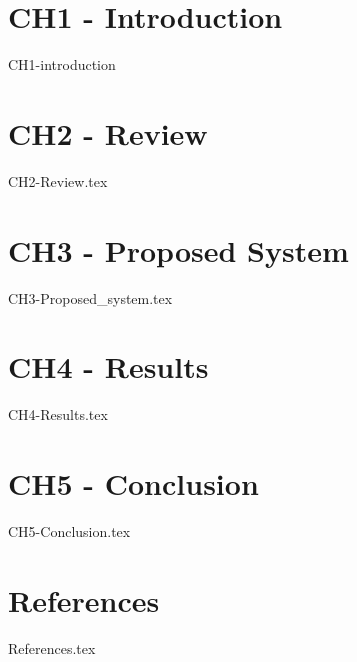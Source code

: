 \documentclass[a4paper,12pt]{book}
\begin{document}
	\tableofcontents
	\chapter{CH1 - Introduction}
	{CH1-introduction}
	
	\chapter{CH2 - Review}
	{CH2-Review.tex}
	
	\chapter{CH3 - Proposed System}
	{CH3-Proposed_system.tex}
	
	\chapter{CH4 - Results}
	{CH4-Results.tex}
	
	\chapter{CH5 - Conclusion}
	{CH5-Conclusion.tex}
	
	\chapter{References}
	{References.tex}
	
\end{document}
